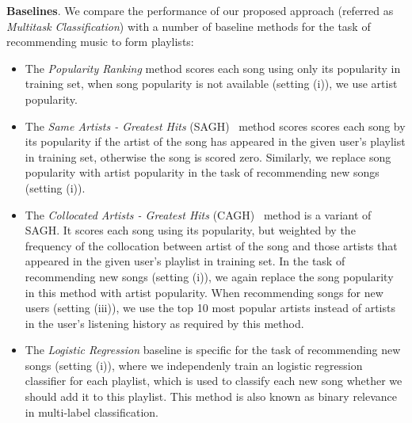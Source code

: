 {\bf Baselines}.
We compare the performance of our proposed approach (referred as {\it Multitask Classification}) 
with a number of baseline methods for the task of recommending music to form playlists:
\begin{itemize}
\item The {\it Popularity Ranking} method scores each song using only its popularity in training set, 
      when song popularity is not available (setting (i)), we use artist popularity.
\item The {\it Same Artists - Greatest Hits} (SAGH)~\cite{mcfee2012million} method scores scores each song
      by its popularity if the artist of the song has appeared in the given user's playlist in training set,
      otherwise the song is scored zero.
      Similarly, we replace song popularity with artist popularity in the task of recommending new songs (setting (i)).
\item The {\it Collocated Artists - Greatest Hits} (CAGH)~\cite{bonnin2013evaluating} method is a variant of SAGH.
      It scores each song using its popularity, but weighted by the frequency of the collocation between artist of the song
      and those artists that appeared in the given user's playlist in training set.
      In the task of recommending new songs (setting (i)), we again replace the song popularity in this method with artist popularity.
      When recommending songs for new users (setting (iii)), we use the top 10 most popular artists instead of artists in the user's
      listening history as required by this method.
\item The {\it Logistic Regression} baseline is specific for the task of recommending new songs (setting (i)), where we independenly train
      an logistic regression classifier for each playlist, which is used to classify each new song whether we should add it to this playlist.
      This method is also known as binary relevance in multi-label classification.
\end{itemize}


